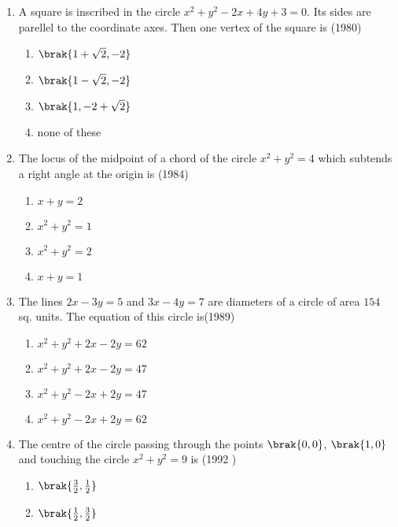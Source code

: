 \begin{enumerate}
    \item A square is inscribed in the circle $x^{2} + y^{2} - 2x +4y +3= 0.$ Its sides are parellel to the coordinate axes. Then one vertex of the square is \hfill {(1980)}
    \begin{multicols}{2}
\begin{enumerate}
    		\item $\brak{1+\sqrt{2},  -2}$ 
    		\item $\brak{1-\sqrt{2},  -2}$
    		\item $\brak{1,  -2 +\sqrt{2}}$
    		\item none of these
    	\end{enumerate}
    \end{multicols}
    \item The locus of the midpoint of a chord of the circle $x^{2}+y^{2}=4$ which subtends a right angle at the origin is \hfill {(1984)}
    \begin{multicols}{2}
\begin{enumerate}
    	\item $x+y=2$
    	\item $x^{2}+y^{2}=1$
    	\item $x^{2}+y^{2}=2$
    	\item $x+y=1$
    \end{enumerate}
\end{multicols}
    \item The lines $2x-3y=5$ and $3x-4y=7$ are diameters of a circle of area $154$ sq. units. The equation of this circle is\hfill {(1989)}
    \begin{multicols}{2}
\begin{enumerate}
    	\item $x^{2}+y^{2}+2x-2y=62$
    	\item $x^{2}+y^{2}+2x-2y=47$
    	\item $x^{2}+y^{2}-2x+2y=47$
    	\item $x^{2}+y^{2}-2x+2y=62$
    \end{enumerate}
\end{multicols}
    \item The centre of the circle passing through the points $\brak{0, 0}$, $\brak{1, 0}$ and touching the circle $x^{2}+y^{2}=9$ is
    \hfill {(1992 )}
    \begin{multicols}{2}
\begin{enumerate}
    	\item $\brak{\frac{3}{2}, \frac{1}{2}}$
    	\item $\brak{\frac{1}{2}, \frac{3}{2}}$

\end{enumerate}
\end{multicols}
\end{enumerate}
